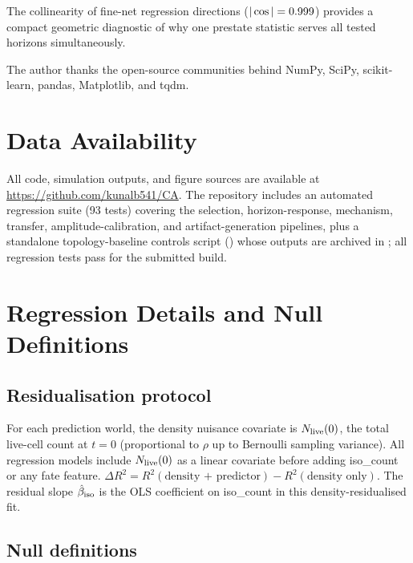 \documentclass[aip,cha,preprint,nofootinbib]{revtex4-2}
\newcommand{\iso}{{\rm iso}}
\newcommand{\biso}{\hat{\beta}_{\iso}}
\begin{document}
The collinearity of fine-net regression directions ($|\cos| = 0.999$)
provides a compact geometric diagnostic of why one prestate statistic
serves all tested horizons simultaneously.

\begin{acknowledgments}
The author thanks the open-source communities behind NumPy, SciPy,
scikit-learn, pandas, Matplotlib, and tqdm.
\end{acknowledgments}

\section*{Data Availability}

All code, simulation outputs, and figure sources are available at
\url{https://github.com/kunalb541/CA}.
The repository includes an automated regression suite (93 tests) covering
the selection, horizon-response, mechanism, transfer, amplitude-calibration,
and artifact-generation pipelines, plus a standalone topology-baseline
controls script () whose
outputs are archived in ;
all regression tests pass for the submitted build.

\appendix

\section{Regression Details and Null Definitions}
\label{app:residual}

\subsection*{Residualisation protocol}

For each prediction world, the density nuisance covariate is
$N_{\rm live}(0)$, the total live-cell count at $t=0$
(proportional to $\rho$ up to Bernoulli sampling variance).
All regression models include $N_{\rm live}(0)$ as a linear covariate
before adding iso\_count or any fate feature.
$\Delta R^2 = R^2(\text{density + predictor}) - R^2(\text{density only})$.
The residual slope $\biso$ is the OLS coefficient on iso\_count in this
density-residualised fit.

\subsection*{Null definitions}
\end{document}
